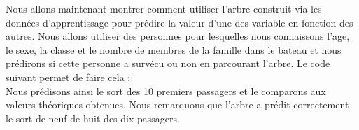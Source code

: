 \documentclass[compress]{beamer}
\begin{document}
\begin{frame}
 Nous allons maintenant montrer comment utiliser l'arbre construit via les données d'apprentissage pour prédire la valeur d'une des variable en fonction des autres.
 Nous allons utiliser des personnes pour lesquelles nous connaissons l'age, le sexe, la classe et le nombre de membres de la famille dans le bateau et nous prédirons
 si cette personne a survécu ou non en parcourant l'arbre. Le code suivant permet de faire cela :\\
 
 Nous prédisons ainsi le sort des 10 premiers passagers et le comparons aux valeurs théoriques obtenues. Nous remarquons que l'arbre a prédit correctement le sort
 de neuf de huit des dix passagers.
\end{frame}
\end{document}
